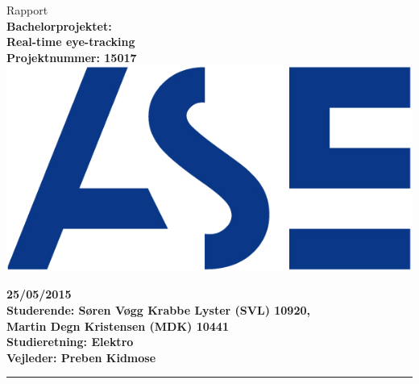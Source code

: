 \documentclass[a4paper,oneside,12pt]{article}
\begin{document}
\begin{titlepage}
\centering
\vfill
{\LARGE Rapport}\\
\vfill
{\bfseries\large
	Bachelorprojektet: \\
	Real-time eye-tracking\\
	Projektnummer: 15017\\
}
\vfill
\includegraphics{ASE_logo.png}
\vfill
{\bfseries\large
	25/05/2015\\
	Studerende: Søren Vøgg Krabbe Lyster (SVL) 10920,\\
	Martin Degn Kristensen (MDK) 10441\\ 
	Studieretning: Elektro \\
	Vejleder: Preben Kidmose \\
	\vfill	
	\rule{6cm}{1pt}
}




\end{titlepage}
\tableofcontents









\appendix

\printbibliography
\end{document}
